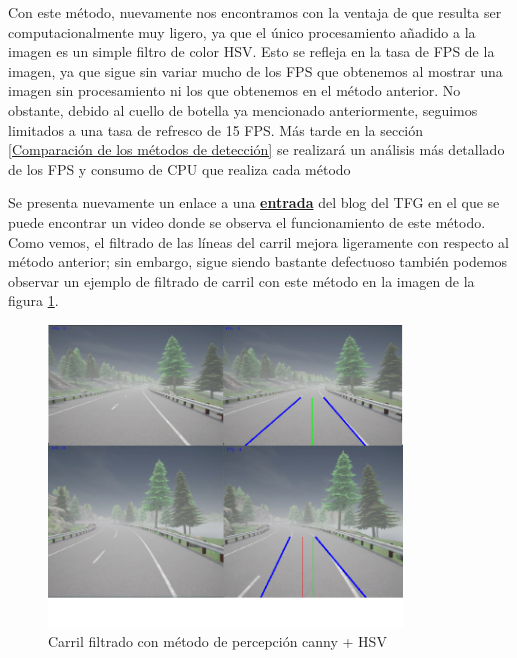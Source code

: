 \bigskip


Con este método, nuevamente nos encontramos con la ventaja de que resulta ser computacionalmente muy ligero, ya que el único procesamiento añadido a la imagen es un simple filtro de color HSV. Esto se refleja en la tasa de \ac{FPS} de la imagen, ya que sigue sin variar mucho de los \ac{FPS} que obtenemos al mostrar una imagen sin procesamiento ni los que obtenemos en el método anterior. No obstante, debido al cuello de botella ya mencionado anteriormente, seguimos limitados a una tasa de refresco de 15 \ac{FPS}. Más tarde en la sección \ref{Comparación de los métodos de detección} se realizará un análisis más detallado de los \ac{FPS} y consumo de \ac{CPU} que realiza cada método

\bigskip

Se presenta nuevamente un enlace a una \href{https://roboticslaburjc.github.io/2022-tfg-juancamilo-carmona/DEMOS/}{\textbf{entrada}} del blog del \ac{TFG} en el que se puede encontrar un video donde se observa el funcionamiento de este método. Como vemos, el filtrado de las líneas del carril mejora ligeramente con respecto al método anterior; sin embargo, sigue siendo bastante defectuoso también podemos observar un ejemplo de filtrado de carril con este método en la imagen de la figura \ref{fig:Carril filtrado con método Canny + HSV}.

\begin{figure} [H]
	\begin{center}
	\includegraphics[height=8cm]{imagenes/cap4/graphics_hsv/carril_filtrado.pdf}
	\end{center}
	\caption[Carril filtrado con método Canny + HSV]{Carril filtrado con método de percepción canny + HSV}
	\label{fig:Carril filtrado con método Canny + HSV}
\end{figure}

